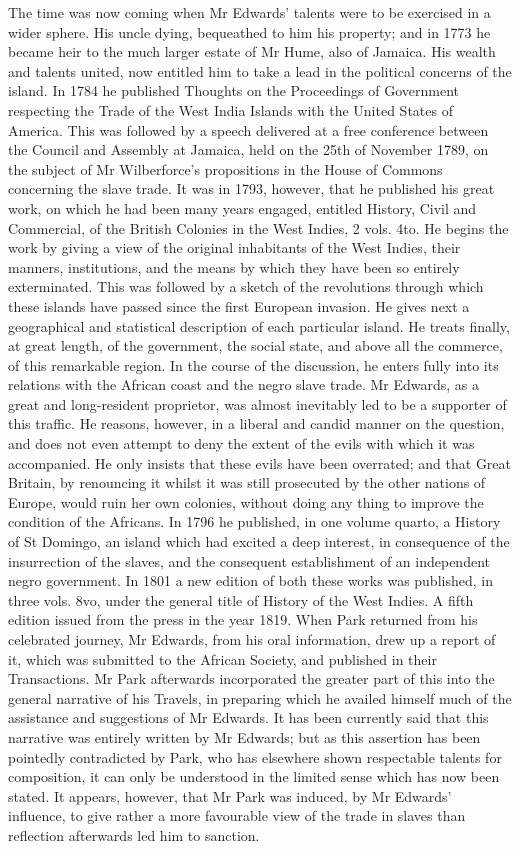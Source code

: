 \documentclass{article}
\begin{document}
The time was now coming when Mr Edwards' talents were to be exercised in a wider sphere. His uncle dying, bequeathed to him his property; and in 1773 he became heir to the much larger estate of Mr Hume, also of Jamaica. His wealth and talents united, now entitled him to take a lead in the political concerns of the island. In 1784 he published Thoughts on the Proceedings of Government respecting the Trade of the West India Islands with the United States of America. This was followed by a speech delivered at a free conference between the Council and Assembly at Jamaica, held on the 25th of November 1789, on the subject of Mr Wilberforce's propositions in the House of Commons concerning the slave trade. It was in 1793, however, that he published his great work, on which he had been many years engaged, entitled History, Civil and Commercial, of the British Colonies in the West Indies, 2 vols. 4to. He begins the work by giving a view of the original inhabitants of the West Indies, their manners, institutions, and the means by which they have been so entirely exterminated. This was followed by a sketch of the revolutions through which these islands have passed since the first European invasion. He gives next a geographical and statistical description of each particular island. He treats finally, at great length, of the government, the social state, and above all the commerce, of this remarkable region. In the course of the discussion, he enters fully into its relations with the African coast and the negro slave trade. Mr Edwards, as a great and long-resident proprietor, was almost inevitably led to be a supporter of this traffic. He reasons, however, in a liberal and candid manner on the question, and does not even attempt to deny the extent of the evils with which it was accompanied. He only insists that these evils have been overrated; and that Great Britain, by renouncing it whilst it was still prosecuted by the other nations of Europe, would ruin her own colonies, without doing any thing to improve the condition of the Africans. In 1796 he published, in one volume quarto, a History of St Domingo, an island which had excited a deep interest, in consequence of the insurrection of the slaves, and the consequent establishment of an independent negro government. In 1801 a new edition of both these works was published, in three vols. 8vo, under the general title of History of the West Indies. A fifth edition issued from the press in the year 1819. When Park returned from his celebrated journey, Mr Edwards, from his oral information, drew up a report of it, which was submitted to the African Society, and published in their Transactions. Mr Park afterwards incorporated the greater part of this into the general narrative of his Travels, in preparing which he availed himself much of the assistance and suggestions of Mr Edwards. It has been currently said that this narrative was entirely written by Mr Edwards; but as this assertion has been pointedly contradicted by Park, who has elsewhere shown respectable talents for composition, it can only be understood in the limited sense which has now been stated. It appears, however, that Mr Park was induced, by Mr Edwards' influence, to give rather a more favourable view of the trade in slaves than reflection afterwards led him to sanction.
\end{document}
